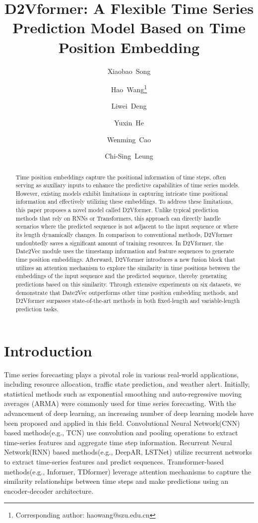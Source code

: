 \documentclass{article}
\title{D2Vformer: A Flexible Time Series Prediction Model Based on Time Position Embedding}
\author[a]{Xiaobao~Song}
\author[a]{Hao~Wang\thanks{Corresponding author: haowang@szu.edu.cn}}
\author[a]{Liwei~Deng}
\author[b]{Yuxin~He}
\author[a]{Wenming~Cao}
\author[c]{Chi-Sing~Leung}
\affil[a]{Shenzhen University, China}
\affil[b]{Shenzhen Technology University, China}
\affil[c]{City University of Hong Kong, Hong Kong, China}
\begin{document}
\maketitle


\begin{abstract}
Time position embeddings capture the positional information of time steps, often serving as auxiliary inputs to enhance the predictive capabilities of time series models. However, existing models exhibit limitations in capturing intricate time positional information and effectively utilizing these embeddings. 
To address these limitations, this paper proposes a novel model called D2Vformer.
Unlike typical prediction methods that rely on RNNs or Transformers, this approach can directly handle scenarios where the predicted sequence is not adjacent to the input sequence or where its length dynamically changes. In comparison to conventional methods, D2Vformer undoubtedly saves a significant amount of training resources. 
In D2Vformer, the Date2Vec module uses the timestamp information and feature sequences to generate time position embeddings. 
Afterward, D2Vformer introduces a new fusion block that utilizes an attention mechanism to explore the similarity in time positions between the embeddings of the input sequence and the predicted sequence, thereby generating predictions based on this similarity. 
Through extensive experiments on six datasets, we demonstrate that Date2Vec outperforms other time position embedding methods, and D2Vformer surpasses state-of-the-art methods in both fixed-length and variable-length prediction tasks.
\end{abstract}


\section{Introduction}


Time series forecasting plays a pivotal role in various real-world applications, including resource allocation\cite{energy_forecasting, solar_forecasting}, traffic state prediction\cite{traffic_congestion,traffic_forecasting_1,traffic_forecasting_2}, and weather alert\cite{wind_forecasting_1,wind_forecasting_2}.
Initially, statistical methods such as exponential smoothing\cite{ex_smoothing} and auto-regressive moving averages (ARMA)\cite{arima_1} were commonly used for time series forecasting.
With the advancement of deep learning, an increasing number of deep learning models have been proposed and applied in this field.  Convolutional Neural Network(CNN) based methods(e.g., TCN\cite{tcn}) use convolution and pooling operations to extract time-series features and aggregate time step information.  Recurrent Neural Network(RNN) based methods(e.g., DeepAR\cite{deepar}, LSTNet\cite{lstnet}) utilize recurrent networks to extract time-series features and predict sequences.  Transformer-based methods(e.g., Informer\cite{informer}, TDformer\cite{tdformer}) leverage attention mechanisms to capture the similarity relationships between time steps and make predictions using an encoder-decoder architecture.
\end{document}
